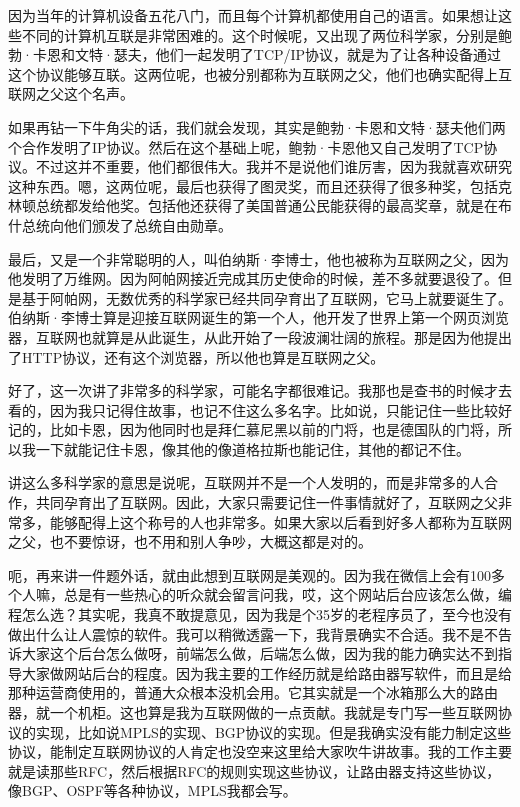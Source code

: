 \documentclass[
  letterpaper,
  DIV=11,
  numbers=noendperiod]{scrreprt}
\begin{document}
因为当年的计算机设备五花八门，而且每个计算机都使用自己的语言。如果想让这些不同的计算机互联是非常困难的。这个时候呢，又出现了两位科学家，分别是鲍勃·卡恩和文特·瑟夫，他们一起发明了TCP/IP协议，就是为了让各种设备通过这个协议能够互联。这两位呢，也被分别都称为互联网之父，他们也确实配得上互联网之父这个名声。

如果再钻一下牛角尖的话，我们就会发现，其实是鲍勃·卡恩和文特·瑟夫他们两个合作发明了IP协议。然后在这个基础上呢，鲍勃·卡恩他又自己发明了TCP协议。不过这并不重要，他们都很伟大。我并不是说他们谁厉害，因为我就喜欢研究这种东西。嗯，这两位呢，最后也获得了图灵奖，而且还获得了很多种奖，包括克林顿总统都发给他奖。包括他还获得了美国普通公民能获得的最高奖章，就是在布什总统向他们颁发了总统自由勋章。

最后，又是一个非常聪明的人，叫伯纳斯·李博士，他也被称为互联网之父，因为他发明了万维网。因为阿帕网接近完成其历史使命的时候，差不多就要退役了。但是基于阿帕网，无数优秀的科学家已经共同孕育出了互联网，它马上就要诞生了。伯纳斯·李博士算是迎接互联网诞生的第一个人，他开发了世界上第一个网页浏览器，互联网也就算是从此诞生，从此开始了一段波澜壮阔的旅程。那是因为他提出了HTTP协议，还有这个浏览器，所以他也算是互联网之父。

好了，这一次讲了非常多的科学家，可能名字都很难记。我那也是查书的时候才去看的，因为我只记得住故事，也记不住这么多名字。比如说，只能记住一些比较好记的，比如卡恩，因为他同时也是拜仁慕尼黑以前的门将，也是德国队的门将，所以我一下就能记住卡恩，像其他的像道格拉斯也能记住，其他的都记不住。

讲这么多科学家的意思是说呢，互联网并不是一个人发明的，而是非常多的人合作，共同孕育出了互联网。因此，大家只需要记住一件事情就好了，互联网之父非常多，能够配得上这个称号的人也非常多。如果大家以后看到好多人都称为互联网之父，也不要惊讶，也不用和别人争吵，大概这都是对的。

呃，再来讲一件题外话，就由此想到互联网是美观的。因为我在微信上会有100多个人嘛，总是有一些热心的听众就会留言问我，哎，这个网站后台应该怎么做，编程怎么选？其实呢，我真不敢提意见，因为我是个35岁的老程序员了，至今也没有做出什么让人震惊的软件。我可以稍微透露一下，我背景确实不合适。我不是不告诉大家这个后台怎么做呀，前端怎么做，后端怎么做，因为我的能力确实达不到指导大家做网站后台的程度。因为我主要的工作经历就是给路由器写软件，而且是给那种运营商使用的，普通大众根本没机会用。它其实就是一个冰箱那么大的路由器，就一个机柜。这也算是我为互联网做的一点贡献。我就是专门写一些互联网协议的实现，比如说MPLS的实现、BGP协议的实现。但是我确实没有能力制定这些协议，能制定互联网协议的人肯定也没空来这里给大家吹牛讲故事。我的工作主要就是读那些RFC，然后根据RFC的规则实现这些协议，让路由器支持这些协议，像BGP、OSPF等各种协议，MPLS我都会写。
\end{document}
